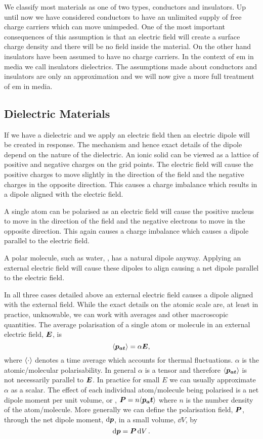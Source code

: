     We classify most materials as one of two types, conductors and insulators.
    Up until now we have considered conductors to have an unlimited supply of free charge carriers which can move unimpeded.
    One of the most important consequences of this assumption is that an electric field will create a surface charge density and there will be no field inside the material.
    On the other hand insulators have been assumed to have no charge carriers.
    In the context of \gls{em} in media we call insulators dielectrics.
    The assumptions made about conductors and insulators are only an approximation and we will now give a more full treatment of \gls{em} in media.
    
    \subsection{Dielectric Materials}\label{sec:dielectric materials}
    If we have a dielectric and we apply an electric field then an electric dipole will be created in response.
    The mechanism and hence exact details of the dipole depend on the nature of the dielectric.
    An ionic solid can be viewed as a lattice of positive and negative charges on the grid points.
    The electric field will cause the positive charges to move slightly in the direction of the field and the negative charges in the opposite direction.
    This causes a charge imbalance which results in a dipole aligned with the electric field.
    
    A single atom can be polarised as an electric field will cause the positive nucleus to move in the direction of the field and the negative electrons to move in the opposite direction.
    This again causes a charge imbalance which causes a dipole parallel to the electric field.
    
    A polar molecule, such as water, , has a natural dipole anyway.
    Applying an external electric field will cause these dipoles to align causing a net dipole parallel to the electric field.
    
    In all three cases detailed above an external electric field causes a dipole aligned with the external field.
    While the exact details on the atomic scale are, at least in practice, unknowable, we can work with averages and other macroscopic quantities.
    The average polarisation of a single atom or molecule in an external electric field, \(\bm{E}\), is
    \[\langle{\bm{p_{at}}}\rangle = \alpha\bm{E},\]
    where \(\langle{\cdot}\rangle\) denotes a time average which accounts for thermal fluctuations.
    \(\alpha\) is the atomic/molecular polarisability.
    In general \(\alpha\) is a tensor and therefore \(\langle{\bm{p_{at}}}\rangle\) is not necessarily parallel to \(\bm{E}\).
    In practice for small \(E\) we can usually approximate \(\alpha\) as a scalar.
    The effect of each individual atom/molecule being polarised is a net dipole moment per unit volume, or , \(\bm{P} = n\langle{\bm{p_at}}\rangle\) where \(n\) is the number density of the atom/molecule.
    More generally we can define the polarisation field, \(\bm{P}\), through the net dipole moment, \(\dd{\bm{p}}\), in a small volume, \(\dd{V}\), by
    \[\dd{\bm{p}} = \bm{P}\dd{V}.\]
    
